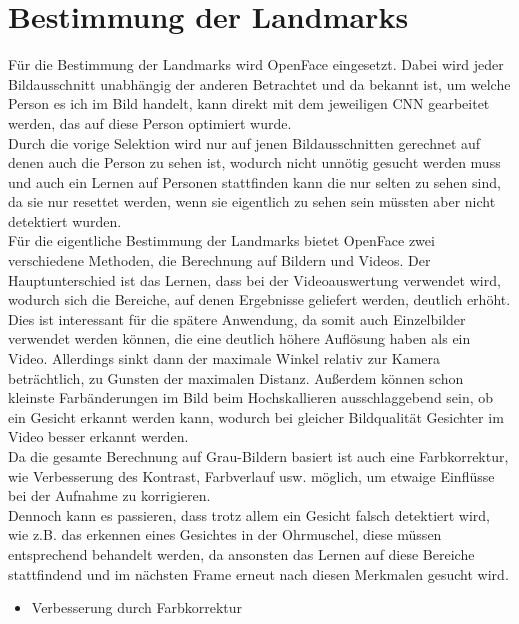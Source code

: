 \section{Bestimmung der Landmarks}
\label{bestimmung_Landmarks}
Für die Bestimmung der Landmarks wird OpenFace eingesetzt. Dabei wird jeder Bildausschnitt unabhängig der anderen Betrachtet und da bekannt ist, um welche Person es ich im Bild handelt, kann direkt mit dem jeweiligen CNN gearbeitet werden, das auf diese Person optimiert wurde.\\
Durch die vorige Selektion wird nur auf jenen Bildausschnitten gerechnet auf denen auch die Person zu sehen ist, wodurch nicht unnötig gesucht werden muss und auch ein Lernen auf Personen stattfinden kann die nur selten zu sehen sind, da sie nur resettet werden, wenn sie eigentlich zu sehen sein müssten aber nicht detektiert wurden.\\
Für die eigentliche Bestimmung der Landmarks bietet OpenFace zwei verschiedene Methoden, die Berechnung auf Bildern und Videos. Der Hauptunterschied ist das Lernen, dass bei der Videoauswertung verwendet wird, wodurch sich die Bereiche, auf denen Ergebnisse geliefert werden, deutlich erhöht.\\
Dies ist interessant für die spätere Anwendung, da somit auch Einzelbilder verwendet werden können, die eine deutlich höhere Auflösung haben als ein Video. Allerdings sinkt dann der maximale Winkel relativ zur Kamera beträchtlich, zu Gunsten der maximalen Distanz. Außerdem können schon kleinste Farbänderungen im Bild beim Hochskallieren ausschlaggebend sein, ob ein Gesicht erkannt werden kann, wodurch bei gleicher Bildqualität Gesichter im Video besser erkannt werden.\\
Da die gesamte Berechnung auf Grau-Bildern basiert ist auch eine Farbkorrektur, wie Verbesserung des Kontrast, Farbverlauf usw. möglich, um etwaige Einflüsse bei der Aufnahme zu korrigieren.\\
Dennoch kann es passieren, dass trotz allem  ein Gesicht falsch detektiert wird, wie z.B. das erkennen eines Gesichtes in der Ohrmuschel, diese müssen entsprechend behandelt werden, da ansonsten das Lernen auf diese Bereiche stattfindend und im nächsten Frame erneut nach diesen Merkmalen gesucht wird.

\begin{itemize}
\item Verbesserung durch Farbkorrektur
\end{itemize}